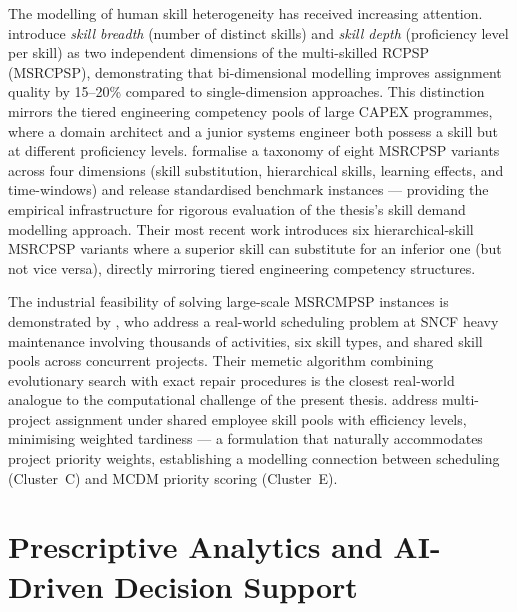 The modelling of human skill heterogeneity has received increasing attention.
\textcite{snauwaert2021algorithm} introduce \textit{skill breadth} (number of distinct skills)
and \textit{skill depth} (proficiency level per skill) as two independent dimensions of the
multi-skilled RCPSP (MSRCPSP), demonstrating that bi-dimensional modelling improves
assignment quality by 15--20\% compared to single-dimension approaches. This distinction
mirrors the tiered engineering competency pools of large CAPEX programmes, where a domain
architect and a junior systems engineer both possess a skill but at different proficiency
levels. \textcite{snauwaert2023classification} formalise a taxonomy of eight MSRCPSP variants
across four dimensions (skill substitution, hierarchical skills, learning effects, and
time-windows) and release standardised benchmark instances — providing the empirical
infrastructure for rigorous evaluation of the thesis's skill demand modelling approach.
Their most recent work \parencite{snauwaert2025hierarchical} introduces six hierarchical-skill
MSRCPSP variants where a superior skill can substitute for an inferior one (but not vice
versa), directly mirroring tiered engineering competency structures.

The industrial feasibility of solving large-scale MSRCMPSP instances is demonstrated by
\textcite{torba2024reallife}, who address a real-world scheduling problem at SNCF heavy
maintenance involving thousands of activities, six skill types, and shared skill pools across
concurrent projects. Their memetic algorithm combining evolutionary search with exact repair
procedures is the closest real-world analogue to the computational challenge of the present
thesis. \textcite{haroune2023multiproject} address multi-project assignment under shared
employee skill pools with efficiency levels, minimising weighted tardiness — a formulation
that naturally accommodates project priority weights, establishing a modelling connection
between scheduling (Cluster~C) and MCDM priority scoring (Cluster~E).

\section{Prescriptive Analytics and AI-Driven Decision Support}
\label{sec:lit_prescriptive}

